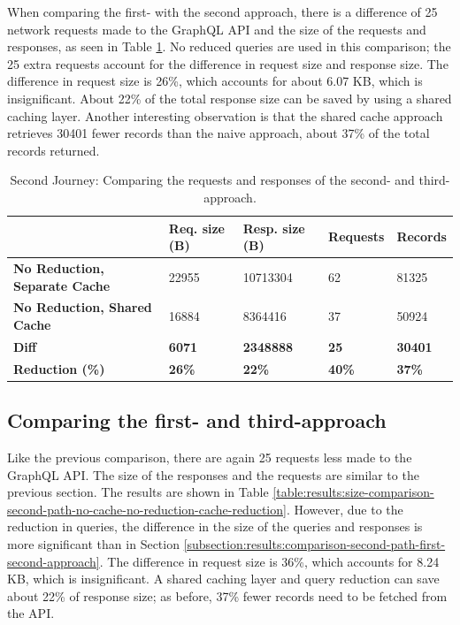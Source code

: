 When comparing the first- with the second approach, there is a difference of 25 network requests made to the GraphQL \ac{API} and the size of the requests and responses, as seen in Table \ref{table:results:size-comparison-second-path-cache-no-reduction-cache-reduction}. No reduced queries are used in this comparison; the 25 extra requests account for the difference in request size and response size. The difference in request size is 26\%, which accounts for about 6.07 KB, which is insignificant. About 22\% of the total response size can be saved by using a shared caching layer. Another interesting observation is that the shared cache approach retrieves 30401 fewer records than the naive approach, about 37\% of the total records returned.

\ifshowTables
\begin{table}[H]
  \begin{tabular}{|l|l|l|l|l|}
  \hline
  & \textbf{Req. size (B)} & \textbf{Resp. size (B)} & \textbf{Requests} & \textbf{Records} \\
  \hline
  \textbf{No Reduction, Separate Cache} & 22955 & 10713304 & 62 & 81325 \\
  \hline
  \textbf{No Reduction, Shared Cache} & 16884 & 8364416 & 37 & 50924 \\
  \hline
  \hline
  \textbf{Diff} & \textbf{6071} & \textbf{2348888} & \textbf{25} & \textbf{30401} \\
  \hline
  \textbf{Reduction (\%)} & \textbf{26\%} & \textbf{22\%} & \textbf{40\%} & \textbf{37\%} \\
  \hline
  \end{tabular}
  \caption{Second Journey: Comparing the requests and responses of the second- and third-approach.}\label{table:results:size-comparison-second-path-cache-no-reduction-cache-reduction}
\end{table}
\fi

\subsection{Comparing the first- and third-approach}\label{subsection:results:comparison-second-path-second-third-approach}

Like the previous comparison, there are again 25 requests less made to the GraphQL \ac{API}. The size of the responses and the requests are similar to the previous section. The results are shown in Table \ref{table:results:size-comparison-second-path-no-cache-no-reduction-cache-reduction}. However, due to the reduction in queries, the difference in the size of the queries and responses is more significant than in Section \ref{subsection:results:comparison-second-path-first-second-approach}. The difference in request size is 36\%, which accounts for 8.24 KB, which is insignificant. A shared caching layer and query reduction can save about 22\% of response size; as before, 37\% fewer records need to be fetched from the \ac{API}.

